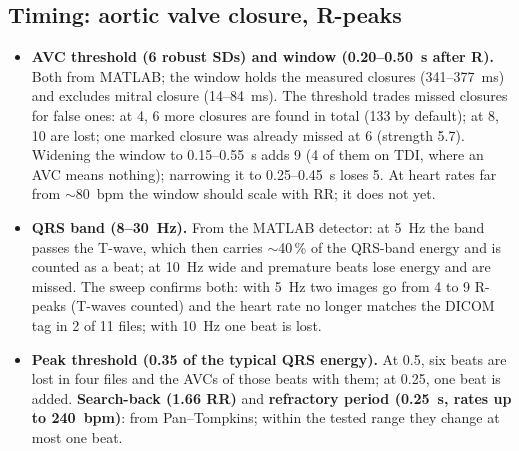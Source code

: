 \documentclass[11pt,a4paper]{article}
\begin{document}
\subsection{Timing: aortic valve closure, R-peaks}
\begin{itemize}
\item \textbf{AVC threshold (6 robust SDs) and window (0.20--0.50~s after R).} Both from MATLAB; the window holds the
measured closures (341--377~ms) and excludes mitral closure (14--84~ms). The threshold trades missed closures for
false ones: at 4, 6 more closures are found in total (133 by default); at 8, 10 are lost; one marked closure was
already missed at 6 (strength 5.7). Widening the window to 0.15--0.55~s adds 9 (4 of them on TDI, where an AVC means nothing);
narrowing it to 0.25--0.45~s loses 5. At heart rates far from $\sim$80~bpm the window should scale with RR; it
does not yet.
\item \textbf{QRS band (8--30~Hz).} From the MATLAB detector: at 5~Hz the band passes the T-wave, which then carries
$\sim$40\,\% of the QRS-band energy and is counted as a beat; at 10~Hz wide and premature beats lose energy and are
missed. The sweep confirms both: with 5~Hz two images go from 4 to 9 R-peaks (T-waves counted) and the heart rate no
longer matches the DICOM tag in 2 of 11 files; with 10~Hz one beat is lost.
\item \textbf{Peak threshold (0.35 of the typical QRS energy).} At 0.5, six beats are lost in four files and the AVCs of those
beats with them; at 0.25, one beat is added. \textbf{Search-back (1.66 RR)} and \textbf{refractory period (0.25~s,
rates up to 240~bpm)}: from Pan--Tompkins; within the tested range they change at most one beat.
\end{itemize}
\end{document}
